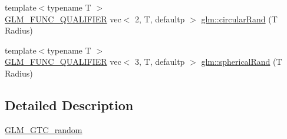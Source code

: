 \begin{DoxyCompactItemize}
\item 
{\footnotesize template$<$typename T $>$ }\\\hyperlink{setup_8hpp_a33fdea6f91c5f834105f7415e2a64407}{G\+L\+M\+\_\+\+F\+U\+N\+C\+\_\+\+Q\+U\+A\+L\+I\+F\+I\+ER} vec$<$ 2, T, defaultp $>$ \hyperlink{group__gtc__random_ga9dd05c36025088fae25b97c869e88517}{glm\+::circular\+Rand} (T Radius)
\item 
{\footnotesize template$<$typename T $>$ }\\\hyperlink{setup_8hpp_a33fdea6f91c5f834105f7415e2a64407}{G\+L\+M\+\_\+\+F\+U\+N\+C\+\_\+\+Q\+U\+A\+L\+I\+F\+I\+ER} vec$<$ 3, T, defaultp $>$ \hyperlink{group__gtc__random_ga22f90fcaccdf001c516ca90f6428e138}{glm\+::spherical\+Rand} (T Radius)
\end{DoxyCompactItemize}


\subsection{Detailed Description}
\hyperlink{group__gtc__random}{G\+L\+M\+\_\+\+G\+T\+C\+\_\+random} 